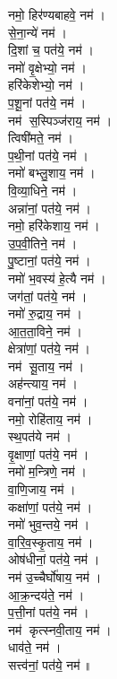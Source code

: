 \begin{multicols}{2}
\setmainfont[Script=Devanagari]{Siddhanta}
\begin{flushleft}
नमो॒ हिर॑ण्यबाहवे॒ नम॑।\\
से॒ना॒न्ये॑  नम॑।\\
दि॒शां च॒ पत॑ये॒ नम॑।\\
नमो॑ वृ॒क्षेभ्यो॒ नम॑।\\
हरि॑केशेभ्यो॒  नम॑।\\
प॒शू॒नां पत॑ये॒  नम॑।\\
नम॑ स॒स्पिञ्ज॑राय॒ नम॑।\\
त्विषी॑मते॒ नम॑।\\
प॒थी॒नां पत॑ये॒ नम॑।\\
नमो॑ बभ्लु॒शाय॒ नम॑।\hfill {}\\
वि॒व्या॒धिने॒ नम॑।\\
अन्ना॑नां॒ पत॑ये॒ नम॑।\\
नमो॒ हरि॑केशाय॒ नम॑।\\
उ॒प॒वी॒तिने॒ नम॑।\\
पु॒ष्टानां॒ पत॑ये॒ नम॑।\\
नमो॑ भ॒वस्य॑ हे॒त्यै नम॑।\\
जग॑तां॒ पत॑ये॒ नम॑।\\
नमो॑ रु॒द्राय॒ नम॑।\\
आ॒त॒ता॒विने॒ नम॑।\\
क्षेत्रा॑णां॒ पत॑ये॒ नम॑।\hfill {}\\
नम॑ सू॒ताय॒ नम॑।\\
अह॑न्त्याय॒ नम॑।\\
वना॑नां॒  पत॑ये॒ नम॑।\\
नमो॒ रोहि॑ताय॒ नम॑।\\
स्थ॒पत॑ये नम॑।\\
वृ॒क्षाणां॒ पत॑ये॒ नम॑।\\
नमो॑ म॒न्त्रिणे॒ नम॑।\\
वा॒णि॒जाय॒ नम॑।\\
कक्षा॑णां॒ पत॑ये॒ नम॑।\\
नमो॑ भुव॒न्तये॒ नम॑।\hfill {}\\
वा॒रि॒व॒स्कृ॒ताय॒ नम॑।\\
ओष॑धीनां॒ पत॑ये॒ नम॑।\\
नम॑ उ॒च्चैर्घो॑षाय॒ नम॑।\\
आ॒क्र॒न्दय॑ते॒ नम॑।\\
प॒त्ती॒नां पत॑ये॒ नम॑।\\
नम॑ कृत्स्नवी॒ताय॒ नम॑।\\
धाव॑ते॒ नम॑।\\
सत्त्व॑नां॒ पत॑ये॒ नम॑॥\\


\end{flushleft}
\end{multicols}
